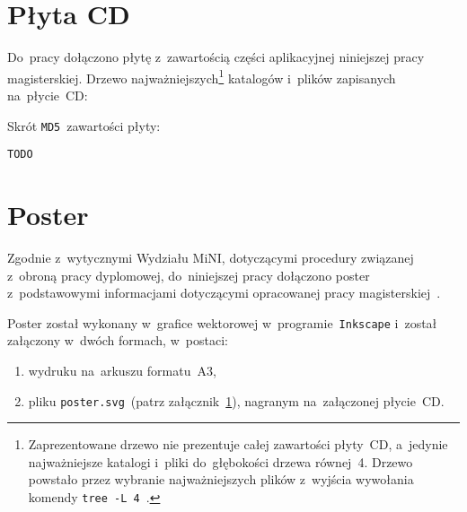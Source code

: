 \documentclass[thesis]{subfiles}
\begin{document}

\begin{appendices}

\chapter{Płyta CD}
\label{cd-appendix}

Do~pracy dołączono płytę z~zawartością części aplikacyjnej niniejszej pracy magisterskiej. Drzewo najważniejszych\footnote{Zaprezentowane drzewo nie prezentuje całej zawartości płyty~CD, a~jedynie najważniejsze katalogi i~pliki do~głębokości drzewa równej~4. Drzewo powstało przez wybranie najważniejszych plików z~wyjścia wywołania komendy \mbox{\texttt{tree~-L~4}}~\cite{tree-manual}.} katalogów i~plików zapisanych na~płycie~CD: %

\noindent Skrót \texttt{MD5}~zawartości płyty:
\begin{center}
\texttt{TODO}
\end{center}

\chapter{Poster}
Zgodnie z~wytycznymi Wydziału MiNI, dotyczącymi procedury związanej z~obroną pracy dyplomowej, do~niniejszej pracy dołączono poster z~podstawowymi informacjami dotyczącymi opracowanej pracy magisterskiej~\cite{informacje-dot-obron}.

Poster został wykonany w~grafice wektorowej w~programie~\texttt{Inkscape} i~został załączony w~dwóch formach, w~postaci:
\begin{enumerate}
	\item wydruku na~arkuszu formatu~A3,
	\item pliku \mbox{\texttt{poster.svg}}~(patrz załącznik~\ref{cd-appendix}), nagranym na~załączonej płycie~CD.
\end{enumerate}

\end{appendices}
\end{document}
